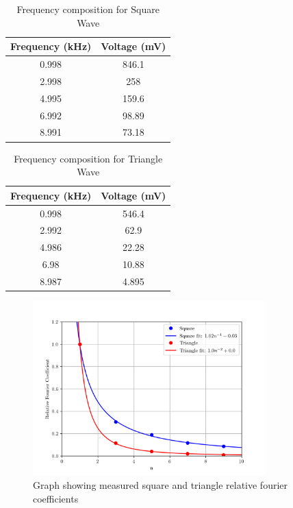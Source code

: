 \documentclass[12pt]{article}
\begin{document}
\begin{table}[h]
    \centering
    \caption{Frequency composition for Square Wave}
    \begin{tabular}{|c|c|}
    \hline
    Frequency (kHz) & Voltage (mV) \\ \hline
    0.998           & 846.1        \\
    2.998           & 258          \\
    4.995           & 159.6        \\
    6.992           & 98.89        \\
    8.991           & 73.18        \\ \hline
    \end{tabular}
\end{table}

\begin{table}[h]
    \centering
    \caption{Frequency composition for Triangle Wave}
    \begin{tabular}{|c|c|}
    \hline
    Frequency (kHz) & Voltage (mV) \\ \hline
    0.998           & 546.4        \\
    2.992           & 62.9         \\
    4.986           & 22.28        \\
    6.98            & 10.88        \\
    8.987           & 4.895        \\ \hline
    \end{tabular}
\end{table}


\begin{figure}[h]
    \centering
    \includegraphics[width=0.8\textwidth]{square_triangle.png}
    \caption{Graph showing measured square and triangle relative fourier coefficients}
    \label{fig:square_triangle}
\end{figure}
\end{document}
